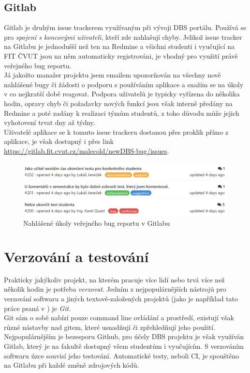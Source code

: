 \subsection{Gitlab}

Gitlab je druhým issue trackerem využívaným při vývoji DBS portálu. Používá se pro \emph{spojení s koncovými uživateli}, kteří zde nahlašují chyby. Jelikož issue tracker na Gitlabu je jednodušší než ten na Redmine a všichni studenti i vyučující na FIT ČVUT jsou na něm automaticky registrováni, je vhodný pro využití právě veřejného bug reportu.\\
Já jakožto manažer projektu jsem emailem upozorňován na všechny nově nahlášené bugy či žádosti o podporu s používáním aplikace a snažím se na úkoly v co nejkratší době reagovat. Podpora uživatelů je typicky vyřízena do několika hodin, opravy chyb či požadavky nových funkcí jsou však interně předány na Redmine a poté zadány k realizaci týmům studentů, z toho důvodu může jejich vyhotovení trvat dny až týdny.\\
Uživatelé aplikace se k tomuto issue trackeru dostanou přes proklik přímo z aplikace, je však dostupný i přes link \url{https://gitlab.fit.cvut.cz/malecold/newDBS-bug/issues}.
\begin{figure}[h]
\includegraphics[width=\textwidth]{../png/gitlab-bug.png}
\caption{Nahlášené úkoly veřejného bug reportu v Gitlabu} \label{picture:gitlab-bug}
\end{figure}


\section{Verzování a testování}

Prakticky jakýkoliv projekt, na kterém pracuje více lidí nebo trvá více než několik hodin je potřeba \emph{verzovat}. Jedním z nejpopulárnějších nástrojů pro verzování softwaru a jiných textově-založených projektů (jako je například tato práce psaná v \XeLaTeX) je \emph{Git}.\\
Git sám o sobě nabízí pouze command line ovládání a prostředí, existují však různé nástavby nad gitem, které usnadňují či zpřehledňují jeho použití. Nejpopulárnějším je bezesporu Github, pro účely DBS projektu je však využíván Gitlab, který je na fakultě dostupný všem studentům i vyučujícím.
S verzováním softwaru úzce souvisí jeho testování. Automatické testy, neboli CI, je spouštěno na Gitlabu při každé změně zdrojových kódů.

